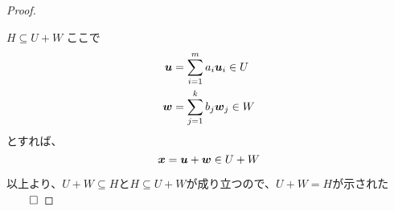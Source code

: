 \documentclass[../../../topic_linear-algebra]{subfiles}
\begin{document}
\begin{proof}
\begin{subpattern}{$H \subseteq U + W$}
    ここで
    \begin{align*}
      \vb*{u} & = \sum_{i=1}^m a_i \vb*{u}_i \in U \\
      \vb*{w} & = \sum_{j=1}^k b_j \vb*{w}_j \in W
    \end{align*}
    とすれば、
    \begin{equation*}
      \vb*{x} = \vb*{u} + \vb*{w} \in U + W
    \end{equation*}
  \end{subpattern}

  \br

  以上より、$U+W \subseteq H$と$H \subseteq U + W$が成り立つので、$U + W = H$が示された $\qed$
\end{proof}
\end{document}
